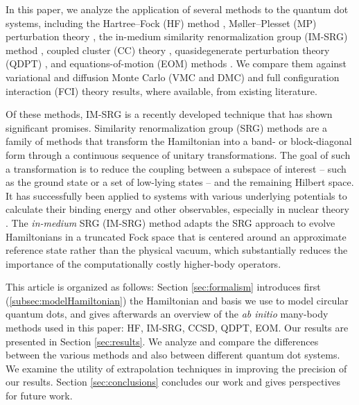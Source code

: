 \documentclass[aip, jcp, 12pt]{revtex4-1}
\begin{document}
In this paper, we analyze the application of several methods to the quantum dot systems, including the Hartree--Fock (HF) method \cite{hartree_1928,Fock1930}, M\o ller--Plesset (MP) perturbation theory \cite{1934PhRv...46..618M}, the in-medium similarity renormalization group (IM-SRG) method \cite{IMSRG}, coupled cluster (CC) theory \cite{PhysRevB.67.045320,heidari:114708,PhysRevB.84.115302}, quasidegenerate perturbation theory (QDPT) \cite{0022-3700-7-18-010,Kvasnicka1974}, and equations-of-motion (EOM) methods \cite{RevModPhys.40.153,StantonBartlettEOM,EMRICH1981379}.  We compare them against variational and diffusion Monte Carlo (VMC and DMC) \cite{PhysRevB.68.035304,PhysRevB.62.8120,PhysRevB.84.115302,PhysRevB.54.4780} and full configuration interaction (FCI) theory \cite{olsen2013thesis,JJAP.36.3924,PhysRevB.56.6428,2008arXiv0810.2644K,rontani:124102} results, where available, from existing literature.

Of these methods, IM-SRG is a recently developed technique that has shown significant promises.  Similarity renormalization group (SRG) methods \cite{PhysRevD.48.5863,PhysRevD.49.4214} are a family of methods that transform the Hamiltonian into a band- or block-diagonal form through a continuous sequence of unitary transformations.  The goal of such a transformation is to reduce the coupling between a subspace of interest -- such as the ground state or a set of low-lying states -- and the remaining Hilbert space.  It has successfully been applied to systems with various underlying potentials to calculate their binding energy and other observables, especially in nuclear theory \cite{ScottSRG,PhysRevC.75.061001,SRGThreeDim}.  The \emph{in-medium} SRG (IM-SRG) method adapts the SRG approach to evolve Hamiltonians in a truncated Fock space that is centered around an approximate reference state rather than the physical vacuum, which substantially reduces the importance of the computationally costly higher-body operators.

This article is organized as follows: Section \ref{sec:formalism} introduces first (\ref{subsec:modelHamiltonian}) the Hamiltonian and basis we use to model circular quantum dots, and gives afterwards an overview of the \textit{ab initio} many-body methods used in this paper: HF, IM-SRG, CCSD, QDPT, EOM.  Our results are presented in Section \ref{sec:results}.  We analyze and compare the differences between the various methods and also between different quantum dot systems.  We examine the utility of extrapolation techniques in improving the precision of our results.  Section \ref{sec:conclusions} concludes our work and gives perspectives for future work.
\end{document}
